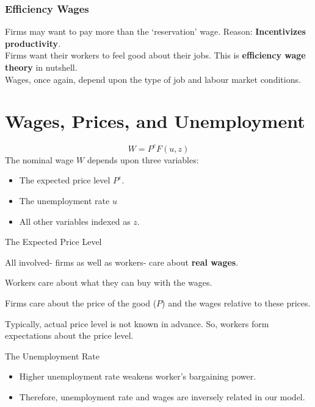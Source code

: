 \documentclass[shownotes,11pt, aspectratio=169]{beamer}
\newenvironment{wideitemize}{\itemize\addtolength{\itemsep}{10pt}}{\enditemize}
\begin{document}
\begin{frame}
\frametitle{Efficiency Wages}
Firms may want to pay more than the `reservation' wage. \pause
Reason: \textbf{Incentivizes productivity}.
\\
\vspace{3mm}
Firms want their workers to feel good about their jobs. This is \textbf{efficiency wage theory} in nutshell.
\\
\vspace{3mm}
Wages, once again, depend upon the type of job and labour market conditions. 
\end{frame}

\section{Wages, Prices, and Unemployment}
\begin{frame}
\[ W = P^eF(u, z) \]
The nominal wage $W$ depends upon three variables:
\begin{itemize}
\item The expected price level $P^e$.
\item The unemployment rate $u$
\item All other variables indexed as $z$.
\end{itemize}
\end{frame}

\begin{frame}{The Expected Price Level}
\begin{wideitemize}
\item All involved- firms as well as workers- care about \textbf{real wages}.
\item Workers care about what they can buy with the wages.
\item Firms care about the price of the good ($P$) and the wages relative to these prices.
\item Typically, actual price level is not known in advance. So, workers form expectations about the price level.
\end{wideitemize}
\end{frame}

\begin{frame}{The Unemployment Rate}
\begin{itemize}
\item Higher unemployment rate weakens \pause worker's bargaining power.
\pause
\item Therefore, unemployment rate and wages are inversely related in our model.
\end{itemize}
\end{frame}
\end{document}
